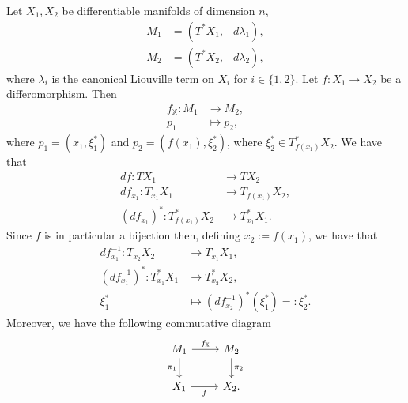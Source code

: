 \documentclass[misc]{subfiles}
\begin{document}
Let $X_1,X_2$ be differentiable manifolds of dimension $n$,
\begin{align*}
    M_1 &= (T^\ast X_1, -d\lambda_1), \\
    M_2 &= (T^\ast X_2, -d\lambda_2),
\end{align*}
where $\lambda_i$ is the canonical Liouville term on $X_i$ for $i\in\{1,2\}$. Let $f:X_1\to X_2$ be a differomorphism. Then
\begin{align*}
    f_\mathbb{X}: M_1 &\to M_2, \\
    p_1 &\mapsto p_2,
\end{align*}
where $p_1 = (x_1,\xi_1^\ast)$ and $p_2 = (f(x_1), \xi_2^\ast)$, where $\xi_2^\ast\in T_{f(x_1)}^\ast X_2$. We have that
\begin{align*}
    df:TX_1 &\to TX_2 \\
    df_{x_1}: T_{x_1}X_1 &\to T_{f(x_1)}X_2, \\
    (df_{x_1})^\ast: T^\ast_{f(x_1)}X_2 &\to T^\ast_{x_1}X_1.
\end{align*}
Since $f$ is in particular a bijection then, defining $x_2:=f(x_1)$, we have that
\begin{align*}
    df^{-1}_{x_1}:T_{x_2}X_2 &\to T_{x_1}X_1, \\
    (df^{-1}_{x_1})^\ast:T_{x_1}^\ast X_1 &\to T_{x_2}^\ast X_2, \\
    \xi_1^\ast &\mapsto (df^{-1}_{x_2})^\ast(\xi_1^\ast) =: \xi_2^\ast.
\end{align*}
Moreover, we have the following commutative diagram
\begin{equation}
    \begin{tikzcd}
        M_1 \arrow[]{d}[swap]{\pi_1} \arrow[]{r}[]{f_\mathbb{X}} &M_2 \arrow[]{d}[]{\pi_2} \\
        X_1 \arrow[]{r}[swap]{f} &X_2.
    \end{tikzcd}
\end{equation}
\end{document}
